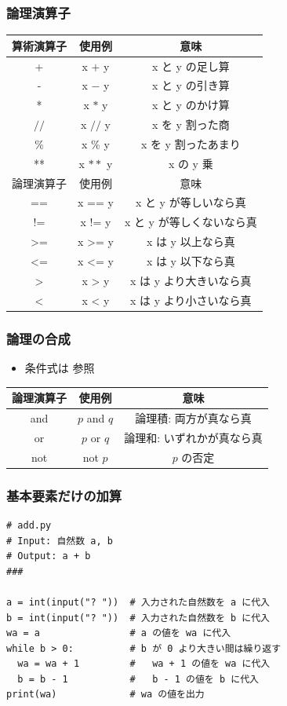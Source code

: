 \begin{frame}[fragile]
\frametitle{論理演算子}
 \begin{center}
  \begin{tabular}{c|c|c}
算術演算子&使用例&意味\\\hline
+& x $+$ y & x と y の足し算\\
-& x $-$ y & x と y の引き算\\
*& x $*$ y & x と y のかけ算\\
$\slash\slash$& x $\slash\slash$ y & x を y 割った商\\
\%& x $\%$ y & x を y 割ったあまり\\
**& x $**$ y & x の y 乗\\\hline
論理演算子&使用例&意味\\\hline
==& x == y & x と y が等しいなら真\\
!=& x != y & x と y が等しくないなら真\\
>=& x >= y & x は y 以上なら真\\
<=& x <= y & x は y 以下なら真\\
>& x > y & x は y より大きいなら真\\
<& x < y & x は y より小さいなら真\\
  \end{tabular}
 \end{center}
\end{frame}
\begin{frame}[fragile]
\frametitle{論理の合成}
  \begin{itemize}
\item 条件式は \href{https://docs.python.org/ja/3/reference/index.html}{}参照
  \end{itemize}
  \begin{center}
    \begin{tabular}{c|c|c}
論理演算子&使用例&意味\\\hline
and & $p$ and $q$ & 論理積: 両方が真なら真\\
or & $p$ or $q$ & 論理和: いずれかが真なら真\\
not & not $p$ & $p$ の否定\\
    \end{tabular}
  \end{center}
\end{frame}
\begin{frame}
\frametitle{基本要素だけの加算}
  \begin{lstlisting}[caption={add.py},label=add]
# add.py
# Input: 自然数 a, b
# Output: a + b
###

a = int(input("? "))  # 入力された自然数を a に代入
b = int(input("? "))  # 入力された自然数を b に代入
wa = a                # a の値を wa に代入
while b > 0:          # b が 0 より大きい間は繰り返す
  wa = wa + 1         #   wa + 1 の値を wa に代入
  b = b - 1           #   b - 1 の値を b に代入
print(wa)             # wa の値を出力
  \end{lstlisting}
\end{frame}
